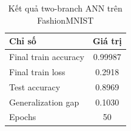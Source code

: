 \begin{table}[H]
\centering
\caption{Kết quả two-branch ANN trên FashionMNIST}
\label{tab:fashion-mnist-two-branch-results}
\begin{tabular}{l c}
\toprule
Chỉ số & Giá trị \\
\midrule
Final train accuracy & 0.99987 \\
Final train loss & 0.2918 \\
Test accuracy & 0.8969 \\
Generalization gap & 0.1030 \\
Epochs & 50 \\
\bottomrule
\end{tabular}
\end{table}
